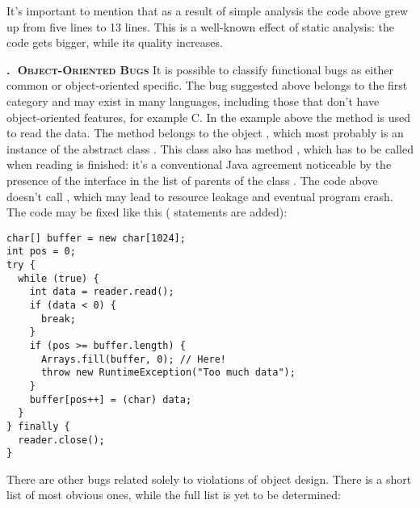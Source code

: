 \documentclass[nosecurity,nobrand]{huawei}
\newcounter{sector}[section]
\renewcommand\thesector{\thesection.\arabic{sector}}
\newcommand{\sector}[1]{\refstepcounter{sector}\vspace{6pt}\textbf{\textsc{\thesector $\;$ #1}}\quad}
\begin{document}
It's important to mention that as a result of simple analysis the code
above grew up from five lines to 13 lines. This is a well-known effect
of static analysis: the code gets bigger, while its quality increases.

\sector{Object-Oriented Bugs}
It is possible to classify functional bugs as either common or object-oriented specific.
The bug suggested above belongs to the first category and may exist in
many languages, including those that don't have object-oriented features,
for example C. In the example above the method  is used to read
the data. The method belongs to the object , which most probably
is an instance of the abstract class . This class
also has method , which has to be called when reading is finished:
it's a conventional Java agreement noticeable by the presence of the
 interface in the list of parents of the class .
The code above doesn't call , which may lead to resource leakage
and eventual program crash. The code may be fixed like this (
statements are added):

\begin{verbatim}
char[] buffer = new char[1024];
int pos = 0;
try {
  while (true) {
    int data = reader.read();
    if (data < 0) {
      break;
    }
    if (pos >= buffer.length) {
      Arrays.fill(buffer, 0); // Here!
      throw new RuntimeException("Too much data");
    }
    buffer[pos++] = (char) data;
  }
} finally {
  reader.close();
}
\end{verbatim}

There are other bugs related solely to violations of object design.
There is a short list of most obvious ones, while the full list is
yet to be determined:
\end{document}
